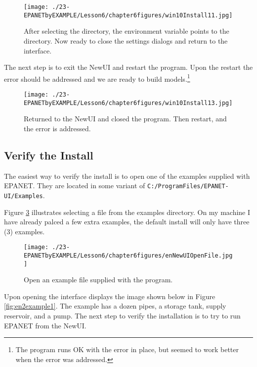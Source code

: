 \begin{figure}[h!] %
   \centering
   \texttt{[image: ./23-EPANETbyEXAMPLE/Lesson6/chapter6figures/win10Install11.jpg]} 
   \caption{After selecting the directory, the environment variable points to the directory.  Now ready to close the settings dialogs and return to the interface.}
   \label{fig:win10Install11}
\end{figure}

The next step is to exit the NewUI and restart the program.  Upon the restart the error should be addressed and we are ready to build models.\footnote{The program runs OK with the error in place, but seemed to work better when the error was addressed.}

\begin{figure}[h!] %
   \centering
   \texttt{[image: ./23-EPANETbyEXAMPLE/Lesson6/chapter6figures/win10Install13.jpg]} 
   \caption{Returned to the NewUI and closed the program.  Then restart, and the error is addressed.}
   \label{fig:win10Install13}
\end{figure}
\clearpage

\subsection{Verify the Install}
The easiest way to verify the install is to open one of the examples supplied with EPANET.   
They are located in some variant of \texttt{C:/ProgramFiles/EPANET-UI/Examples}.

Figure \ref{fig:enNewUIOpenFile} illustrates selecting a file from the examples directory.
On my machine I have already palced a few extra examples, the default install will only have three (3) examples.

\begin{figure}[h!] %
   \centering
   \texttt{[image: ./23-EPANETbyEXAMPLE/Lesson6/chapter6figures/enNewUIOpenFile.jpg]} 
   \caption{Open an example file supplied with the program.}
   \label{fig:enNewUIOpenFile}
\end{figure}

Upon opening the interface displays the image shown below in Figure \ref{fig:en2example1}.
The example has a dozen pipes, a storage tank, supply reservoir, and a pump.
The next step to verify the installation is to try to run EPANET from the NewUI.

